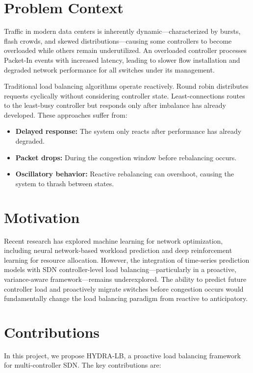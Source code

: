 \documentclass[12pt,a4paper]{report}
\begin{document}
\section{Problem Context}

Traffic in modern data centers is inherently dynamic---characterized by bursts, flash crowds, and skewed distributions---causing some controllers to become overloaded while others remain underutilized. An overloaded controller processes Packet-In events with increased latency, leading to slower flow installation and degraded network performance for all switches under its management.

Traditional load balancing algorithms operate reactively. Round robin distributes requests cyclically without considering controller state. Least-connections routes to the least-busy controller but responds only after imbalance has already developed. These approaches suffer from:

\begin{itemize}
    \item \textbf{Delayed response:} The system only reacts after performance has already degraded.
    \item \textbf{Packet drops:} During the congestion window before rebalancing occurs.
    \item \textbf{Oscillatory behavior:} Reactive rebalancing can overshoot, causing the system to thrash between states.
\end{itemize}

\section{Motivation}

Recent research has explored machine learning for network optimization, including neural network-based workload prediction and deep reinforcement learning for resource allocation. However, the integration of time-series prediction models with SDN controller-level load balancing---particularly in a proactive, variance-aware framework---remains underexplored. The ability to predict future controller load and proactively migrate switches before congestion occurs would fundamentally change the load balancing paradigm from reactive to anticipatory.

\section{Contributions}

In this project, we propose HYDRA-LB, a proactive load balancing framework for multi-controller SDN. The key contributions are:
\end{document}
